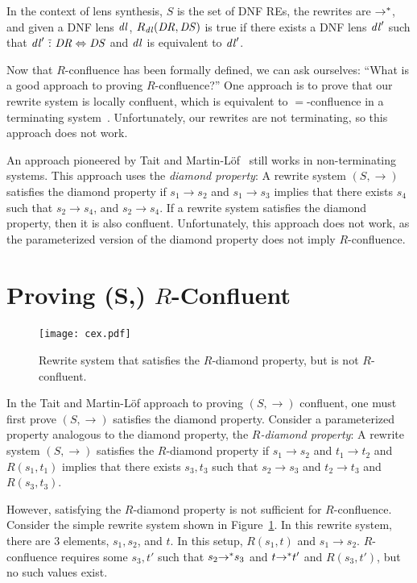 \documentclass{easychair}
\begin{document}
In the context of lens synthesis, $S$ is the set of DNF REs,
the rewrites are ${\rightarrow}^*$, and given a DNF lens $\mathit{dl}$,
$R_{\mathit{dl}}(\mathit{DR},\mathit{DS})$ is true if there exists a DNF lens $\mathit{dl}'$ such
that $\mathit{dl}' \,\,\tilde{:}\,\, \mathit{DR} \Leftrightarrow \mathit{DS}$ and
$\mathit{dl}$ is equivalent to $\mathit{dl}'$.

Now that $R$-confluence has been formally defined, we can ask ourselves: ``What
is a good approach to proving $R$-confluence?'' One approach is to prove that
our rewrite system is locally confluent, which is equivalent to $=$-confluence
in a terminating system~\cite{huetconf}. Unfortunately, our rewrites are not
terminating, so this approach does not work.

An approach pioneered by Tait and Martin-L\"{o}f~\cite{barendrecht} still works
in non-terminating systems. This approach uses the \emph{diamond property}: A
rewrite system $(S,\rightarrow)$ satisfies the diamond property if $s_1
\rightarrow s_2$ and $s_1 \rightarrow s_3$ implies that there exists $s_4$ such
that $s_2 \rightarrow s_4$, and $s_2 \rightarrow s_4$. If a rewrite system
satisfies the diamond property, then it is also confluent. Unfortunately, this
approach does not work, as the parameterized version of the diamond property
does not imply $R$-confluence.

\section{Proving (S,\StarOf{\rightarrow}) $R$-Confluent}

\begin{figure}
  \centering
    \texttt{[image: cex.pdf]}
    \caption{Rewrite system that satisfies the $R$-diamond property, but is not
      $R$-confluent.}
    \label{fig:cex}
\end{figure}

In the Tait and Martin-L\"{o}f approach to proving $(S,\rightarrow)$ confluent,
one must first prove $(S,\rightarrow)$ satisfies the diamond property. Consider
a parameterized property analogous to the diamond property, the
\emph{$R$-diamond property}: A rewrite system $(S,\rightarrow)$ satisfies the
$R$-diamond property if $s_1 \rightarrow s_2$ and $t_1 \rightarrow t_2$ and
$R(s_1,t_1)$ implies that there exists $s_3,t_3$ such that $s_2 \rightarrow s_3$
and $t_2 \rightarrow t_3$ and $R(s_3,t_3)$.

However, satisfying the $R$-diamond property is not sufficient for
$R$-confluence. Consider the simple rewrite system shown in
Figure~\ref{fig:cex}. In this rewrite system, there are 3 elements, $s_1,s_2$,
and $t$. In this setup, $R(s_1,t)$ and $s_1 \rightarrow s_2$. $R$-confluence
requires some $s_3,t'$ such that $s_2 {\rightarrow}^* s_3$ and $t
{\rightarrow}^* t'$ and $R(s_3,t')$, but no such values exist.
\end{document}
